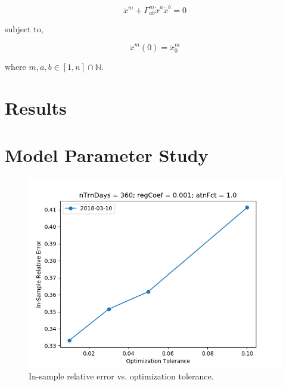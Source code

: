 \documentclass{article}
\begin{document}
\begin{equation}\label{eqn:geodesic}
\ddot{x}^{m} + \Gamma^{m}_{ab} \dot{x}^{a} \dot{x}^{b} = 0
\end{equation}

subject to,

\begin{equation}\label{eqn:geodesic-bc}
\dot{x}^{m}(0) = \dot{x}^{m}_{0}
\end{equation}

where $m,a,b \in [1,n] \cap \mathbb{N}$.

\section{Results}\label{section:results}

\section{Model Parameter Study}\label{section:model-parameter-study}

\begin{figure}\label{fig:tolerance-sensitivity-error}
\includegraphics[bb=0 0 640 480]{figures/tolerance-sensitivity-error.png}
\caption{In-sample relative error vs. optimization tolerance.}
\end{figure}
\end{document}
